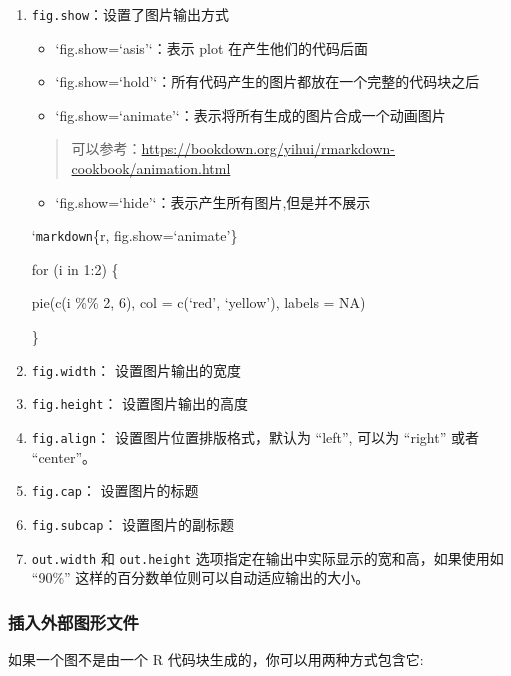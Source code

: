 \documentclass[
]{book}
\providecommand{\tightlist}{%
  \setlength{\itemsep}{0pt}\setlength{\parskip}{0pt}}
\begin{document}
\begin{enumerate}
\def\labelenumi{\arabic{enumi}.}
\item
  \texttt{fig.show}：设置了图片输出方式

  \begin{itemize}
  \item
    `fig.show=`asis'`：表示 plot 在产生他们的代码后面
  \item
    `fig.show=`hold'`：所有代码产生的图片都放在一个完整的代码块之后
  \item
    `fig.show=`animate'`：表示将所有生成的图片合成一个动画图片
  \end{itemize}

  \begin{quote}
  可以参考：\url{https://bookdown.org/yihui/rmarkdown-cookbook/animation.html}
  \end{quote}

  \begin{itemize}
  \tightlist
  \item
    `fig.show=`hide'`：表示产生所有图片,但是并不展示
  \end{itemize}

  `\texttt{markdown}\{r, fig.show=`animate'\}

  for (i in 1:2) \{

  pie(c(i \%\% 2, 6), col = c(`red', `yellow'), labels = NA)

  \}
\item
  \texttt{fig.width}： 设置图片输出的宽度
\item
  \texttt{fig.height}： 设置图片输出的高度
\item
  \texttt{fig.align}： 设置图片位置排版格式，默认为 ``left'', 可以为 ``right''
  或者 ``center''。
\item
  \texttt{fig.cap}： 设置图片的标题
\item
  \texttt{fig.subcap}： 设置图片的副标题
\item
  \texttt{out.width} 和 \texttt{out.height}
  选项指定在输出中实际显示的宽和高，如果使用如 ``90\%''
  这样的百分数单位则可以自动适应输出的大小。
\end{enumerate}

\hypertarget{ux63d2ux5165ux5916ux90e8ux56feux5f62ux6587ux4ef6}{%
\subsubsection{插入外部图形文件}\label{ux63d2ux5165ux5916ux90e8ux56feux5f62ux6587ux4ef6}}

如果一个图不是由一个 R 代码块生成的，你可以用两种方式包含它:
\end{document}

